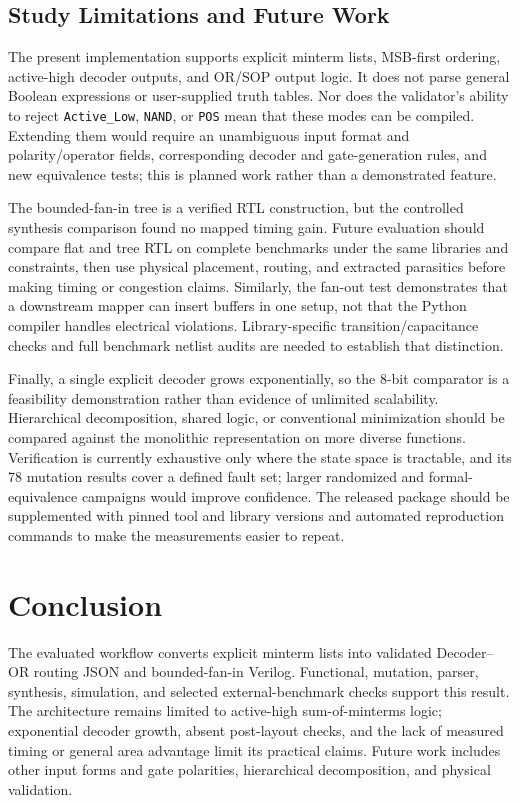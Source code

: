 \documentclass[runningheads]{llncs}
\begin{document}
\subsection{Study Limitations and Future Work}
The present implementation supports explicit minterm lists, MSB-first ordering, active-high decoder outputs, and OR/SOP output logic. It does not parse general Boolean expressions or user-supplied truth tables. Nor does the validator's ability to reject \texttt{Active\_Low}, \texttt{NAND}, or \texttt{POS} mean that these modes can be compiled. Extending them would require an unambiguous input format and polarity/operator fields, corresponding decoder and gate-generation rules, and new equivalence tests; this is planned work rather than a demonstrated feature.

The bounded-fan-in tree is a verified RTL construction, but the controlled synthesis comparison found no mapped timing gain. Future evaluation should compare flat and tree RTL on complete benchmarks under the same libraries and constraints, then use physical placement, routing, and extracted parasitics before making timing or congestion claims. Similarly, the fan-out test demonstrates that a downstream mapper can insert buffers in one setup, not that the Python compiler handles electrical violations. Library-specific transition/capacitance checks and full benchmark netlist audits are needed to establish that distinction.

Finally, a single explicit decoder grows exponentially, so the 8-bit comparator is a feasibility demonstration rather than evidence of unlimited scalability. Hierarchical decomposition, shared logic, or conventional minimization should be compared against the monolithic representation on more diverse functions. Verification is currently exhaustive only where the state space is tractable, and its 78 mutation results cover a defined fault set; larger randomized and formal-equivalence campaigns would improve confidence. The released package should be supplemented with pinned tool and library versions and automated reproduction commands to make the measurements easier to repeat.

\section{Conclusion}
The evaluated workflow converts explicit minterm lists into validated Decoder--OR routing JSON and bounded-fan-in Verilog. Functional, mutation, parser, synthesis, simulation, and selected external-benchmark checks support this result. The architecture remains limited to active-high sum-of-minterms logic; exponential decoder growth, absent post-layout checks, and the lack of measured timing or general area advantage limit its practical claims. Future work includes other input forms and gate polarities, hierarchical decomposition, and physical validation.
\end{document}
